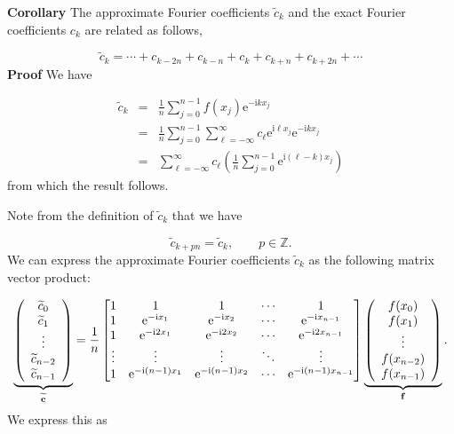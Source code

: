 \documentclass[12pt,a4paper]{article}
\begin{document}
\textbf{Corollary} The approximate Fourier coefficients $\widetilde{c}_k$ and the exact Fourier coefficients $c_k$ are related as follows,

\[
\widetilde{c}_k = \cdots + c_{k-2n} + c_{k-n} +  c_k +  c_{k+n} + c_{k+2n} + \cdots
\]
\textbf{Proof}  We have


\begin{eqnarray*}
  \widetilde{c}_k   &=&\frac{1}{n}\sum_{j = 0}^{n-1} f(x_j)\mathrm{e}^{-\mathrm{i}kx_j}   \\
    & = & \frac{1}{n}\sum_{j = 0}^{n-1} \sum_{\ell=-\infty}^{\infty} c_{\ell}\mathrm{e}^{\mathrm{i}\ell x_j} \mathrm{e}^{-\mathrm{i}kx_j}  \\
    &=& \sum_{\ell=-\infty}^{\infty}c_{\ell}\left(\frac{1}{n}\sum_{j = 0}^{n-1} \mathrm{e}^{\mathrm{i}(\ell-k) x_j}   \right)
\end{eqnarray*}
from which the result follows.

Note from the definition of $\widetilde{c}_{k}$ that we have

\[
\widetilde{c}_{k+pn} = \widetilde{c}_{k}, \qquad p \in \mathbb{Z}.  
\]
We can express the approximate Fourier coefficients $\widetilde{c}_k$ as the following matrix vector product:

\[
\underbrace{\left(
\begin{array}{c}
\widetilde{c}_0 \\
\widetilde{c}_1 \\
\vdots \\
\widetilde{c}_{n-2} \\
\widetilde{c}_{n-1}
\end{array}
\right)}_{\widetilde{\mathbf{c}}} = 
{1 \over n} \begin{bmatrix} 1 & 1 & 1&  \ensuremath{\cdots} & 1 \\
                                    1 & {\rm e}^{-{\rm i} x_1} & {\rm e}^{-{\rm i} x_2} & \ensuremath{\cdots} & {\rm e}^{-{\rm i} x_{n-1}} \\
                                    1 & {\rm e}^{-{\rm i} 2 x_1} & {\rm e}^{-{\rm i} 2 x_2} & \ensuremath{\cdots} & {\rm e}^{-{\rm i} 2x_{n-1}} \\
                                    \ensuremath{\vdots} & \ensuremath{\vdots} & \ensuremath{\vdots} & \ensuremath{\ddots} & \ensuremath{\vdots} \\
                                    1 & {\rm e}^{-{\rm i} (n-1) x_1} & {\rm e}^{-{\rm i} (n-1) x_2} & \ensuremath{\cdots} & {\rm e}^{-{\rm i} (n-1) x_{n-1}}
\end{bmatrix} 
\underbrace{\left(
\begin{array}{c}
f(x_0) \\
f(x_1) \\
\vdots \\
f(x_{n-2}) \\
f(x_{n-1})
\end{array}
\right)}_{\mathbf{f}}.
\]
We express this as
\end{document}

